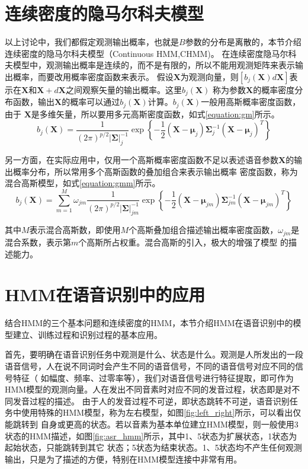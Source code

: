 \section{连续密度的隐马尔科夫模型}

    以上讨论中，我们都假定观测输出概率，也就是$B$参数的分布是离散的，本节介绍连续密度的隐马尔科夫模型（Continuous HMM,CHMM)。
    在连续密度隐马尔科夫模型中，观测输出概率是连续的，而不是有限的，所以不能用观测矩阵来表示输出概率，而要改用概率密度函数来表示。
    假设$\bm{X}$为观测向量，则$[b_{j}(\bm{X})d\bm{X}]$表示在$\bm{X}$和$\bm{X}+d\bm{X}$之间观察矢量的输出概率。这里$b_{j}(\bm{X})$
    称为参数$\bm{X}$的概率密度分布函数，输出$\bm{X}$的概率可以通过$b_{j}(\bm{X})$计算。$b_{j}(\bm{X})$一般用高斯概率密度函数，由于
    $\bm{X}$是多维矢量，所以要用多元高斯密度函数，如式\ref{equation:gm}所示。
    \begin{equation}\label{equation:gm}
       {b_j}(\bm{X}) = \frac{1}{{{{(2\pi )}^{p/2}}{|{\bm{\Sigma}} |_j^{ - 1}}}}\exp \left\{ { - \frac{1}{2}(\bm{X} - {{\bm{\mu}} _j}) {\bm{\Sigma}}_j^{ - 1}{{(\bm{X} - {{\bm{\mu}}_j})}^T}} \right\}
    \end{equation}

    另一方面，在实际应用中，仅用一个高斯概率密度函数不足以表述语音参数$\bm{X}$的输出概率分布，所以常用多个高斯函数的叠加组合来表示输出概率
    密度函数，称为混合高斯模型，如式\ref{equation:gmm}所示。
    \begin{equation}\label{equation:gmm}
       {b_j}(\bm{X}) = \sum\limits_{m = 1}^M {{\omega _{jm}}} \frac{1}{{{{(2\pi )}^{p/2}}|{\bm{\Sigma}} |_{jm}^{ - 1}}}\exp \left\{ { - \frac{1}{2}(\bm{X} - {{\bm{\mu}} _{jm}}){\bm{\Sigma}}_{jm}^{ - 1}{{(\bm{X} - {{\bm{\mu}} _{jm}})}^T}} \right\}
    \end{equation}

    其中$M$表示混合高斯数，即使用$M$个高斯叠加组合描述输出概率密度函数，${\omega_{jm}}$是混合系数，表示第$m$个高斯所占权重。混合高斯的引入，极大的增强了模型
    的描述能力。


\section{HMM在语音识别中的应用}
    结合HMM的三个基本问题和连续密度的HMM，本节介绍HMM在语音识别中的模型建立、训练过程和识别过程的基本应用。

    首先，要明确在语音识别任务中观测是什么、状态是什么。观测是人所发出的一段语音信号，人在说不同词时会产生不同的语音信号，不同的语音信号对应不同的信号特征（
    如幅度、频率、过零率等），我们对语音信号进行特征提取，即可作为HMM模型的观测向量。人在发出不同音素时对应不同的发音过程，状态即是对不同发音过程的描述。
    由于人的发音过程不可逆，即状态跳转不可逆，语音识别任务中使用特殊的HMM模型，称为左右模型，如图\ref{fig:left_right}所示，可以看出仅能跳转到
    自身或更高的状态。若以音素为基本单位建立HMM模型，则一般使用3状态的HMM描述，如图\ref{fig:asr_hmm}所示，其中1、5状态为扩展状态，1状态为起始状态，只能跳转到其它
    状态；5状态为结束状态。1、5状态均不产生任何观测输出，只是为了描述的方便，特别在HMM模型连接中非常有用。

